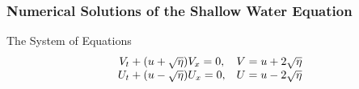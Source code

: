 \documentclass[screen]{beamer}
\begin{document}
\begin{frame}
    
\end{frame}

\begin{frame}
	\frametitle{Numerical Solutions of the Shallow Water Equation}
	\begin{block}{The System of Equations}
		\begin{align*}
		\begin{array}{c c}
		V_t + (u+\sqrt{\eta})V_x = 0, & V = u + 2 \sqrt \eta\\
		U_t + (u-\sqrt{\eta})U_x = 0, & U = u - 2\sqrt \eta
		\end{array}
		\end{align*}
	\end{block}
\end{frame}
\end{document}
